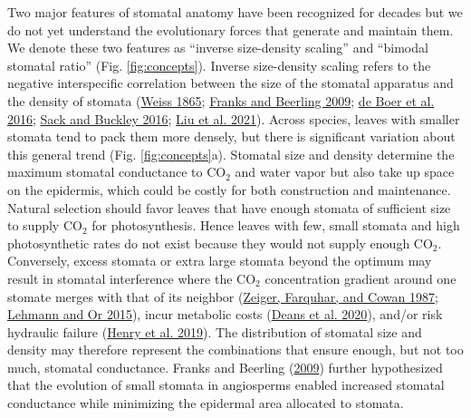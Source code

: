 \documentclass[
  12pt,
]{article}
\begin{document}
Two major features of stomatal anatomy have been recognized for decades but we do not yet understand the evolutionary forces that generate and maintain them. We denote these two features as ``inverse size-density scaling'' and ``bimodal stomatal ratio'' (Fig. \ref{fig:concepts}). Inverse size-density scaling refers to the negative interspecific correlation between the size of the stomatal apparatus and the density of stomata (\protect\hyperlink{ref-weiss_untersuchungen_1865}{Weiss 1865}; \protect\hyperlink{ref-franks_maximum_2009}{Franks and Beerling 2009}; \protect\hyperlink{ref-de_boer_optimal_2016}{de Boer et al. 2016}; \protect\hyperlink{ref-sack_developmental_2016}{Sack and Buckley 2016}; \protect\hyperlink{ref-liu_scaling_2021}{Liu et al. 2021}). Across species, leaves with smaller stomata tend to pack them more densely, but there is significant variation about this general trend (Fig. \ref{fig:concepts}a). Stomatal size and density determine the maximum stomatal conductance to CO\(_2\) and water vapor but also take up space on the epidermis, which could be costly for both construction and maintenance. Natural selection should favor leaves that have enough stomata of sufficient size to supply CO\(_2\) for photosynthesis. Hence leaves with few, small stomata and high photosynthetic rates do not exist because they would not supply enough CO\(_2\). Conversely, excess stomata or extra large stomata beyond the optimum may result in stomatal interference where the CO\(_2\) concentration gradient around one stomate merges with that of its neighbor (\protect\hyperlink{ref-zeiger_stomatal_1987}{Zeiger, Farquhar, and Cowan 1987}; \protect\hyperlink{ref-lehmann_effects_2015}{Lehmann and Or 2015}), incur metabolic costs (\protect\hyperlink{ref-deans_optimization_2020}{Deans et al. 2020}), and/or risk hydraulic failure (\protect\hyperlink{ref-henry_stomatal_2019}{Henry et al. 2019}). The distribution of stomatal size and density may therefore represent the combinations that ensure enough, but not too much, stomatal conductance. Franks and Beerling (\protect\hyperlink{ref-franks_maximum_2009}{2009}) further hypothesized that the evolution of small stomata in angiosperms enabled increased stomatal conductance while minimizing the epidermal area allocated to stomata.
\end{document}
